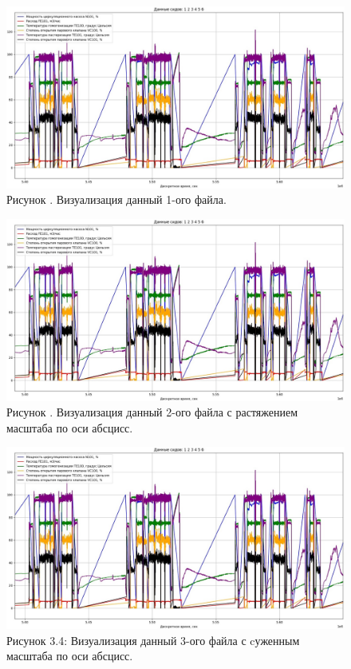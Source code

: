 {  \begin{figure}
    \centering
    \def\svgwidth{\textwidth}
    \includegraphics[width=\textwidth]{images/data_1_visual.jpg}
    \caption*{\gostFont Рисунок \thechaptercntr .\theimagecntr \spc {--} Визуализация данный 1-ого файла.}
    \label{fig:NNBlackBox}
  \end{figure} \addtocounter{imagecntr}{1}

  \begin{figure}
    \centering
    \def\svgwidth{\textwidth}
    \includegraphics[width=\textwidth]{images/data_1_visual.jpg}
    \caption*{\gostFont Рисунок \thechaptercntr .\theimagecntr \spc {--} Визуализация данный 2-ого файла с растяжением масштаба по оси абсцисс.}
    \label{fig:NNBlackBox}
  \end{figure} \addtocounter{imagecntr}{1}

  \begin{figure}
    \centering
    \def\svgwidth{\textwidth}
    \includegraphics[width=\textwidth]{images/data_1_visual.jpg}
    \caption*{\gostFont Рисунок 3.4: Визуализация данный 3-ого файла с cуженным масштаба по оси абсцисс.}
    \label{fig:NNBlackBox}
  \end{figure} \addtocounter{imagecntr}{1}

}
